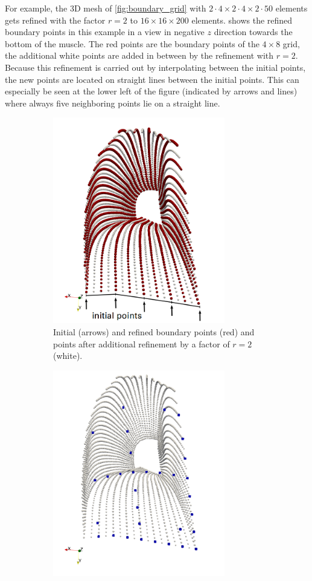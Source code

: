 For example, the 3D mesh of \cref{fig:boundary_grid} with $2\cdot 4 \times 2\cdot 4 \times 2\cdot 50$ elements gets refined with the factor $r=2$ to $16 \times 16 \times 200$ elements.
 shows the refined boundary points in this example in a view in negative $z$ direction towards the bottom of the muscle. The red points are the boundary points of the $4 \times 8$ grid, the additional white points are added in between by the refinement with $r=2$. 
Because this refinement is carried out by interpolating between the initial points, the new points are located on straight lines between the initial points.
This can especially be seen at the lower left of the figure (indicated by arrows and lines) where always five neighboring points lie on a straight line. 

\begin{figure}%
  \centering%
  \begin{subfigure}[t]{0.45\textwidth}%
    \centering%
    \includegraphics[height=9cm]{images/parallel_fiber_estimation/02_boundary_points_2.png}
    \caption{Initial (arrows) and refined boundary points (red) and points after additional refinement by a factor of $r=2$ (white).}%
    \label{fig:02_boundary_points}%
  \end{subfigure}   
  \quad
  \begin{subfigure}[t]{0.45\textwidth}%
    \centering%
    \includegraphics[height=9cm]{images/parallel_fiber_estimation/03_seed_points.png}

\end{subfigure}
\end{figure}
